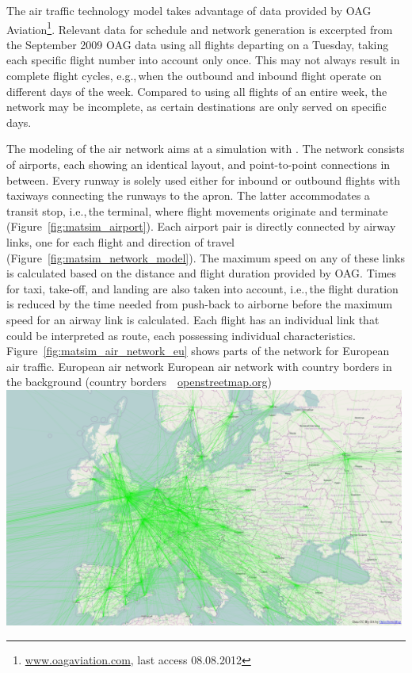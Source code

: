 The air traffic technology model takes advantage of data provided by OAG Aviation\footnote{\url{www.oagaviation.com}, last access 08.08.2012}. 
Relevant data for schedule and network generation is excerpted from the September 2009 OAG data using all flights departing on a Tuesday, taking each specific flight number into account only once.
This may not always result in complete flight cycles, e.g.,\,when the outbound and inbound flight operate on different days of the week. 
Compared to using all flights of an entire week, the network may be incomplete, as certain destinations are only served on specific days.

The modeling of the air network aims at a simulation with .  
The network consists of airports, each showing an identical layout, and point-to-point connections in between. 
Every runway is solely used either for inbound or outbound flights with taxiways connecting the runways to the apron. The latter accommodates a transit stop, i.e.,\,the terminal, where flight movements originate and terminate (Figure~\ref{fig:matsim_airport}). 
Each airport pair is directly connected by airway links, one for each flight and direction of travel (Figure~\ref{fig:matsim_network_model}). 
The maximum speed on any of these links is calculated based on the distance and flight duration provided by OAG. 
Times for taxi, take-off, and landing are also taken into account, i.e.,\,the flight duration is reduced by the time needed from push-back to airborne before the maximum speed for an airway link is calculated.
Each flight has an individual link that could be interpreted as route, each possessing individual characteristics. 
Figure~\ref{fig:matsim_air_network_eu} shows parts of the network for European air traffic.
%
\createfigure%
{European air network}%
{European air network with country borders in the background (country borders~\textcopyright~\url{openstreetmap.org})}%
{\label{fig:matsim_air_network_eu}}%
{\includegraphics[width=0.99\textwidth, angle=0]{extending/figures/air/air_network_europe_osm.png}}%
{\citet{Grether2014PhD}}

